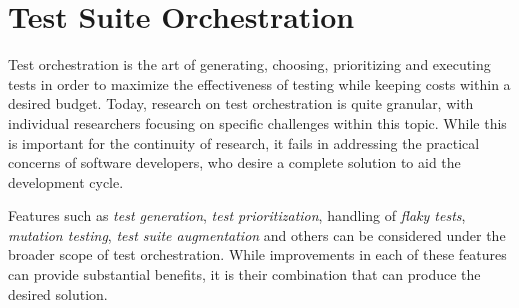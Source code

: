 \section{Test Suite Orchestration}\label{sec:orchestration}
Test orchestration is the art of generating, choosing, prioritizing and executing tests in order to maximize the effectiveness of testing while keeping costs within a desired budget.
Today, research on test orchestration is quite granular, with individual researchers focusing on specific challenges within this topic.
While this is important for the continuity of research, it fails in addressing the practical concerns of software developers, who desire a complete solution to aid the development cycle.

Features such as \textit{test generation}, \textit{test prioritization}, handling of \textit{flaky tests}, \textit{mutation testing}, \textit{test suite augmentation} and others can be considered under the broader scope of test orchestration.
While improvements in each of these features can provide substantial benefits, it is their combination that can produce the desired solution.

